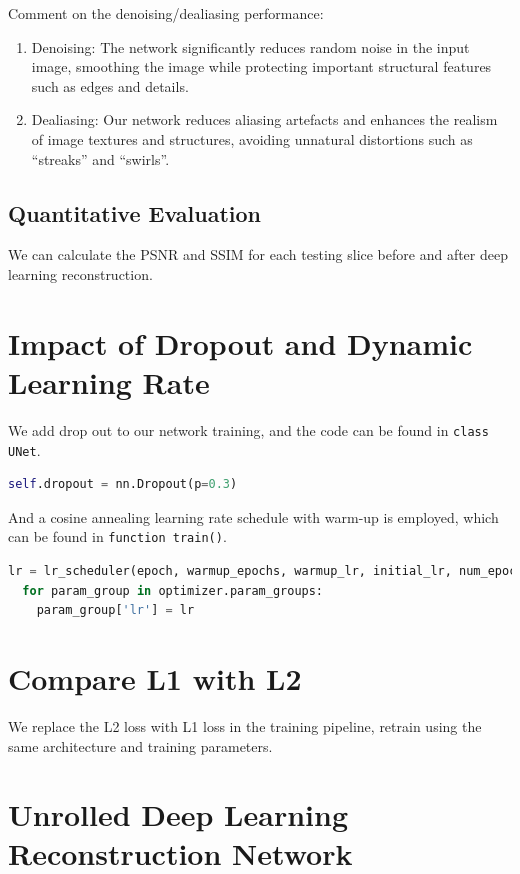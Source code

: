 \documentclass{article}
\begin{document}
Comment on the denoising/dealiasing performance: 
\begin{enumerate}
  \item Denoising: The network significantly reduces random noise in the input image, 
  smoothing the image while protecting important structural features such as edges and details.
  \item Dealiasing: Our network reduces aliasing artefacts and enhances the realism of image 
  textures and structures, avoiding unnatural distortions such as “streaks” and “swirls”.
\end{enumerate}

\subsection{Quantitative Evaluation}
We can calculate the PSNR and SSIM for each testing slice before and after deep 
learning reconstruction. 



\section{Impact of Dropout and Dynamic Learning Rate}
We add drop out to our network training, and the code can be found in \texttt{class UNet}.
\begin{lstlisting}[language=Python, caption={Add Dropout}]
  self.dropout = nn.Dropout(p=0.3)
\end{lstlisting}
And a cosine annealing learning rate schedule with warm-up is employed, which can be
 found in \texttt{function train()}.
\begin{lstlisting}[language=Python, caption={Add Dynamic Learning Rate}]
  lr = lr_scheduler(epoch, warmup_epochs, warmup_lr, initial_lr, num_epochs)
  for param_group in optimizer.param_groups:
    param_group['lr'] = lr
\end{lstlisting}



\section{Compare L1 with L2}
We replace the L2 loss with L1 loss in the training pipeline, 
retrain using the same architecture and training parameters.




\section{Unrolled Deep Learning Reconstruction Network}
\end{document}
